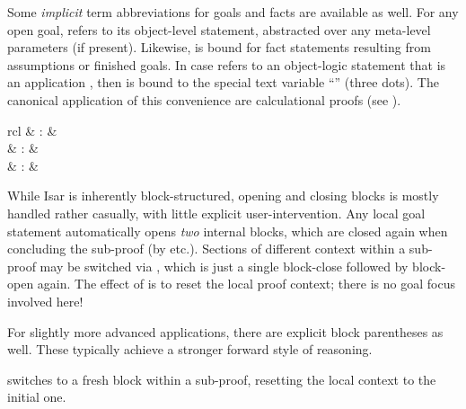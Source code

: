 \begin{isabellebody}
\begin{isamarkuptext}
  Some \emph{implicit} term abbreviations
  for goals and facts are available as well.  For any open goal,
   refers to its object-level statement,
  abstracted over any meta-level parameters (if present).  Likewise,
   is bound for fact statements resulting from
  assumptions or finished goals.  In case  refers to
  an object-logic statement that is an application , then
   is bound to the special text variable ``\isa{{\isasymdots}}''
  (three dots).  The canonical application of this convenience are
  calculational proofs (see ).%
\end{isamarkuptext}%
\isamarkuptrue%
%
\isamarkuptrue%
%
\begin{isamarkuptext}%
\begin{matharray}{rcl}
     & : &  \\
    \isa{\isacommand{{\isacharbraceleft}}} & : &  \\
    \isa{\isacommand{{\isacharbraceright}}} & : &  \\
  \end{matharray}

  While Isar is inherently block-structured, opening and closing
  blocks is mostly handled rather casually, with little explicit
  user-intervention.  Any local goal statement automatically opens
  \emph{two} internal blocks, which are closed again when concluding
  the sub-proof (by  etc.).  Sections of different
  context within a sub-proof may be switched via ,
  which is just a single block-close followed by block-open again.
  The effect of  is to reset the local proof context;
  there is no goal focus involved here!

  For slightly more advanced applications, there are explicit block
  parentheses as well.  These typically achieve a stronger forward
  style of reasoning.

  \begin{descr}

  \item [\isa{\isacommand{next}}] switches to a fresh block within a
  sub-proof, resetting the local context to the initial one.


\end{descr}
\end{isamarkuptext}
\end{isabellebody}
